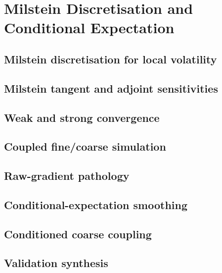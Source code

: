 \chapter{Milstein Discretisation and Conditional Expectation}
\label{ch:milstein}

\section{Milstein discretisation for local volatility}
\label{sec:milstein-scheme}

\section{Milstein tangent and adjoint sensitivities}
\label{sec:milstein-sensitivities}

\section{Weak and strong convergence}
\label{sec:milstein-convergence}

\section{Coupled fine/coarse simulation}
\label{sec:milstein-coupling}

\section{Raw-gradient pathology}
\label{sec:milstein-pathology}

\section{Conditional-expectation smoothing}
\label{sec:milstein-smoothing}

\section{Conditioned coarse coupling}
\label{sec:milstein-conditioned}

\section{Validation synthesis}
\label{sec:milstein-validation}
